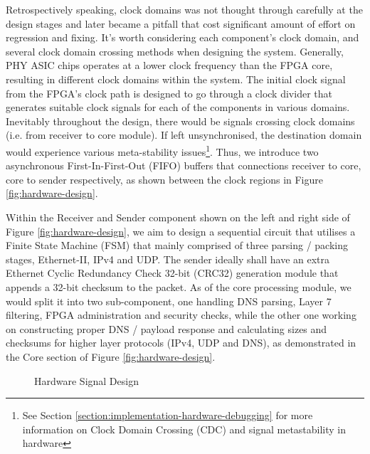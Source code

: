 \documentclass[a4paper]{report}
\begin{document}
Retrospectively speaking, clock domains was not thought through carefully at the design stages and later became a pitfall that cost significant amount of effort on regression and fixing. It's worth considering each component's clock domain, and several clock domain crossing methods when designing the system. Generally, PHY ASIC chips operates at a lower clock frequency than the FPGA core, resulting in different clock domains within the system. The initial clock signal from the FPGA's clock path is designed to go through a clock divider that generates suitable clock signals for each of the components in various domains. Inevitably throughout the design, there would be signals crossing clock domains (i.e. from receiver to core module). If left unsynchronised, the destination domain would experience various meta-stability issues\footnote{See Section \ref{section:implementation-hardware-debugging} for more information on Clock Domain Crossing (CDC) and signal metastability in hardware}. Thus, we introduce two asynchronous First-In-First-Out (FIFO) buffers that connections receiver to core, core to sender respectively, as shown between the clock regions in Figure \ref{fig:hardware-design}.

Within the Receiver and Sender component shown on the left and right side of Figure \ref{fig:hardware-design}, we aim to design a sequential circuit that utilises a Finite State Machine (FSM)  that mainly comprised of three parsing / packing stages, Ethernet-II, IPv4 and UDP. The sender ideally shall have an extra Ethernet Cyclic Redundancy Check 32-bit (CRC32) \cite{ieee802.3ethernet-2018} generation module that appends a 32-bit checksum to the packet. As of the core processing module, we would split it into two sub-component, one handling DNS parsing, Layer 7 filtering, FPGA administration and security checks, while the other one working on constructing proper DNS / payload response and calculating sizes and checksums for higher layer protocols (IPv4, UDP and DNS), as demonstrated in the Core section of Figure \ref{fig:hardware-design}.

\begin{figure}[h!]
  \caption{Hardware Signal Design}
  \label{fig:hardware-signal-design}
\end{figure}
\end{document}
